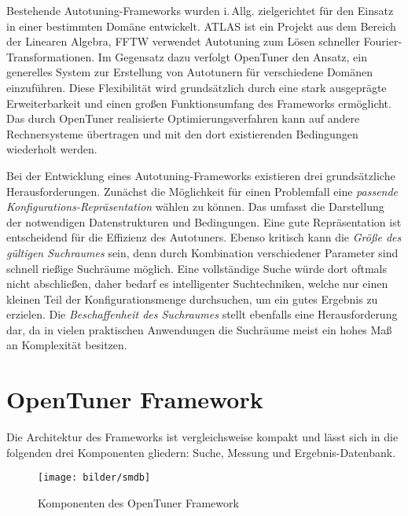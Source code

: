 \documentclass[a4paper,11pt]{scrartcl}
\newcommand{\iAllg}{\mbox{i.\,Allg.}\xspace}
\begin{document}
Bestehende Autotuning-Frameworks wurden \iAllg zielgerichtet für den Einsatz in einer 
bestimmten Domäne entwickelt. \textsc{ATLAS} \cite{atlas} ist ein Projekt aus dem Bereich der Linearen Algebra,
\textsc{FFTW} \cite{fftw} verwendet Autotuning zum Lösen schneller Fourier-Transformationen.
Im Gegensatz dazu verfolgt OpenTuner den Ansatz, ein generelles System zur Erstellung 
von Autotunern für verschiedene Domänen einzuführen. Diese Flexibilität wird grundsätzlich durch eine stark
ausgeprägte Erweiterbarkeit und einen großen Funktionsumfang des Frameworks ermöglicht.
Das durch OpenTuner realisierte Optimierungsverfahren kann auf andere Rechnersysteme übertragen
und mit den dort existierenden Bedingungen wiederholt werden. \newline

Bei der Entwicklung eines Autotuning-Frameworks existieren drei grundsätzliche Herausforderungen.
Zunächst die Möglichkeit für einen Problemfall eine \emph{passende Konfigurations-Repräsentation} wählen
zu können. Das umfasst die Darstellung der notwendigen Datenstrukturen und Bedingungen. Eine gute 
Repräsentation ist entscheidend für die Effizienz des Autotuners. Ebenso kritisch kann die 
\emph{Größe des gültigen Suchraumes} sein, denn durch Kombination verschiedener Parameter sind 
schnell rießige Suchräume möglich. Eine vollständige Suche würde dort oftmals nicht abschließen,
daher bedarf es intelligenter Suchtechniken, welche nur einen kleinen Teil der Konfigurationsmenge
durchsuchen, um ein gutes Ergebnis zu erzielen. Die \emph{Beschaffenheit des Suchraumes} stellt
ebenfalls eine Herausforderung dar, da in vielen praktischen Anwendungen die Suchräume meist ein
hohes Maß an Komplexität besitzen.



\section{OpenTuner Framework}
Die Architektur des Frameworks ist vergleichsweise kompakt und lässt sich in die folgenden drei 
Komponenten gliedern: Suche, Messung und Ergebnis-Datenbank.

\begin{figure}[h]
\begin{center}
\texttt{[image: bilder/smdb]}
\cite{OT-paper} \caption{Komponenten des OpenTuner Framework} 
\end{center}   
\end{figure}
\end{document}
